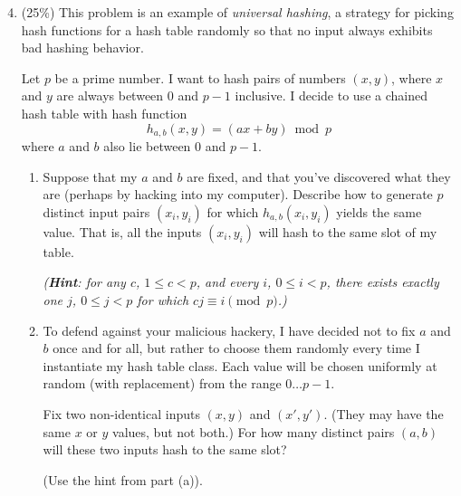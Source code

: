 \documentclass[11pt]{article}
\begin{document}
\begin{enumerate}
\setcounter{enumi}{3}
\item (25\%)
This problem is an example of \textit{universal hashing},
a strategy for picking hash functions for a hash table randomly so
that no input always exhibits bad hashing behavior.

Let $p$ be a prime number.  I want to hash pairs of numbers $(x,y)$,
where $x$ and $y$ are always between 0 and $p-1$ inclusive.  I
decide to use a chained hash table with hash function
\[
h_{a,b}(x,y) = (ax + by) \bmod p
\]
where $a$ and $b$ also lie between 0 and $p-1$.
\begin{enumerate}
\item Suppose that my $a$ and $b$ are fixed, and that you've discovered what
they are (perhaps by hacking into my computer).  Describe how to
generate $p$ distinct input pairs $(x_i, y_i)$ for which
$h_{a,b}(x_i,y_i)$ yields the same value.  That is, all the inputs
$(x_i,y_i)$ will hash to the same slot of my table.

\textit{(\textbf{Hint}: for any $c$, $1 \leq c < p$, and every $i$, $0
\leq i < p$, there exists exactly one $j$, $0 \leq j < p$ for which
$cj \equiv i \pmod p$.)}



\item To defend against your malicious hackery, I have decided not to fix
$a$ and $b$ once and for all, but rather to choose them randomly every
time I instantiate my hash table class.  Each value will be chosen
uniformly at random (with replacement) from the range $0 \ldots p-1$.

Fix two non-identical inputs $(x,y)$ and $(x',y')$.  (They may have
the same $x$ or $y$ values, but not both.) For how many distinct pairs
$(a,b)$ will these two inputs hash to the same slot?

(Use the hint from part (a)).


\end{enumerate}
\end{enumerate}
\end{document}
